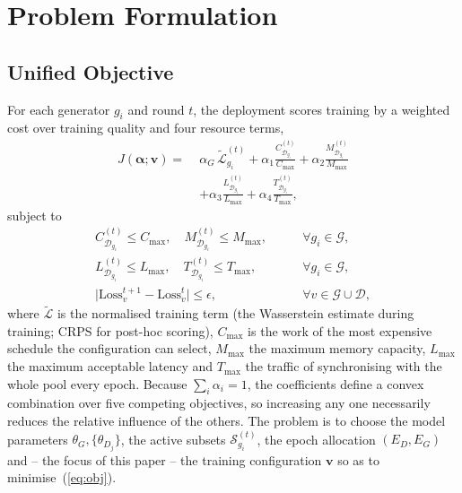 \documentclass[journal]{IEEEtran}
\newcommand{\valpha}{\boldsymbol{\alpha}}
\newcommand{\J}{J}
\begin{document}
\section{Problem Formulation}
\label{sec:problem}

\subsection{Unified Objective}
For each generator $g_i$ and round $t$, the deployment scores training by a
weighted cost over training quality and four resource terms,
\begin{equation}
\begin{split}
\J(\valpha;\mathbf{v})=\;&\alpha_G\,\tilde{\mathcal{L}}^{(t)}_{g_i}
 +\alpha_1\frac{C^{(t)}_{\mathcal{D}_{g_i}}}{C_{\max}}
 +\alpha_2\frac{M^{(t)}_{\mathcal{D}_{g_i}}}{M_{\max}}\\
 &+\alpha_3\frac{L^{(t)}_{\mathcal{D}_{g_i}}}{L_{\max}}
 +\alpha_4\frac{T^{(t)}_{\mathcal{D}_{g_i}}}{T_{\max}},
\end{split}
\label{eq:obj}
\end{equation}
subject to
\begin{align}
C^{(t)}_{\mathcal{D}_{g_i}}\le C_{\max},\quad
M^{(t)}_{\mathcal{D}_{g_i}}\le M_{\max},&\qquad\forall g_i\in\mathcal{G},
\label{eq:c1}\\
L^{(t)}_{\mathcal{D}_{g_i}}\le L_{\max},\quad
T^{(t)}_{\mathcal{D}_{g_i}}\le T_{\max},&\qquad\forall g_i\in\mathcal{G},
\label{eq:c2}\\
\big|\mathrm{Loss}^{t+1}_v-\mathrm{Loss}^{t}_v\big|\le\epsilon,&\qquad\forall v\in\mathcal{G}\cup\mathcal{D},
\label{eq:c3}
\end{align}
where $\tilde{\mathcal{L}}$ is the normalised training term (the Wasserstein
estimate during training; CRPS for post-hoc scoring), $C_{\max}$ is the work of
the most expensive schedule the configuration can select, $M_{\max}$ the
maximum memory capacity, $L_{\max}$ the maximum acceptable latency and
$T_{\max}$ the traffic of synchronising with the whole pool every epoch. Because
$\sum_i\alpha_i=1$, the coefficients define a convex combination over five
competing objectives, so increasing any one necessarily reduces the relative
influence of the others. The problem is to choose the model parameters
$\theta_G,\{\theta_{D_j}\}$, the active subsets $\mathcal{S}^{(t)}_{g_i}$, the
epoch allocation $(E_D,E_G)$ and -- the focus of this paper -- the training
configuration $\mathbf{v}$ so as to minimise~(\ref{eq:obj}).
\end{document}
